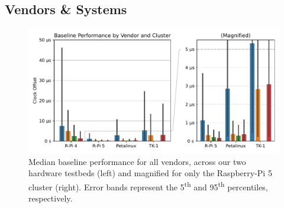 \subsection{Vendors \& Systems}

\begin{figure}
    \centering
    \includegraphics[width=\linewidth]{res/generated/base/vendor_comparison.pdf}
    \legend
    \caption{Median baseline performance for all vendors, across our two hardware testbeds (left) and magnified for only the Raspberry-Pi 5 cluster (right). Error bands represent the 5\textsuperscript{th} and 95\textsuperscript{th} percentiles, respectively.}
    \label{fig:baseline}
\end{figure}

